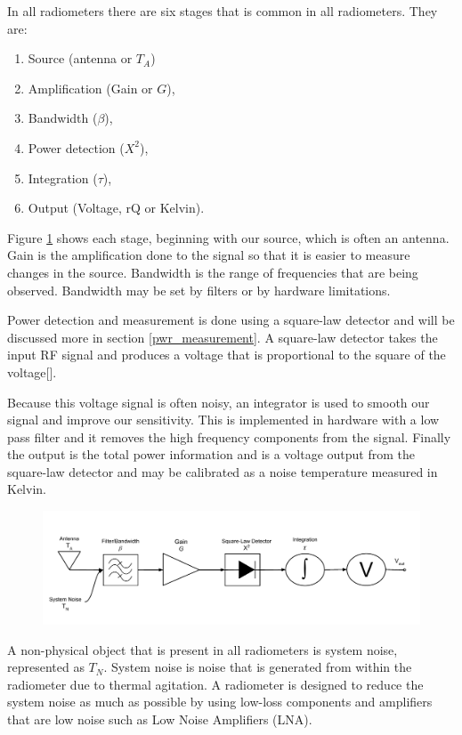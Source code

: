 In all radiometers there are six stages that is common in all radiometers.  They are:

\begin{enumerate}
\item Source (antenna or $T_{A}$)
\item Amplification (Gain or $G$),
\item Bandwidth ($\beta$),
\item Power detection ($X^{2}$),
\item Integration ($\tau$),
\item Output (Voltage, rQ or Kelvin).
\end{enumerate}

Figure \ref{trad_radiometer} shows each stage, beginning with our source, which is often an antenna.  Gain is the amplification done to the signal so that it is easier to measure changes in the source.  Bandwidth is the range of frequencies that are being observed.  Bandwidth may be set by filters or by hardware limitations. 

Power detection and measurement is done using a square-law detector and will be discussed more in section \ref{pwr_measurement}.  A square-law detector takes the input RF signal and produces a voltage that is proportional to the square of the voltage[\cite{Leinweber}].  

Because this voltage signal is often noisy, an integrator is used to smooth our signal and improve our sensitivity. This is implemented in hardware with a low pass filter and it removes the high frequency components from the signal.  Finally the output is the total power information and is a voltage output from the square-law detector and may be calibrated as a noise temperature measured in Kelvin.

{\begin{figure}[h!tb] 
\centering
\includegraphics[width=\textwidth]{Images/Traditional_Radiometer.pdf}
\label{trad_radiometer}
\end{figure}
}

A non-physical object that is present in all radiometers is system noise, represented as $T_{N}$.  System noise is noise that is generated from within the radiometer due to thermal agitation.  A radiometer is designed to reduce the system noise as much as possible by using low-loss components and amplifiers that are low noise such as Low Noise Amplifiers (LNA). 

